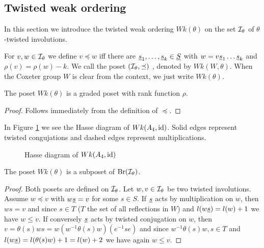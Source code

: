 \subsection{Twisted weak ordering}
\label{sec:twisted-involutions-twisted-weak-ordering}

In this section we introduce the twisted weak ordering $Wk(\theta)$ on the set $\mathcal{I}_{\theta}$ of $\theta$-twisted involutions.

\begin{defi}
	For $v,w \in \mathcal{I}_{\theta}$ we define $v \preceq w$ iff there are $\underline{s}_1, \ldots, \underline{s}_k \in \underline{S}$ with $w = v \underline{s}_1 \ldots \underline{s}_k$ and $\rho(v) = \rho(w) - k$. We call the poset $(\mathcal{I}_{\theta},\preceq)$ , denoted by $Wk(W, \theta)$. When the Coxeter group $W$ is clear from the context, we just write $Wk(\theta)$.
\end{defi}

\begin{lemm}
	The poset $Wk(\theta)$ is a graded poset with rank function $\rho$.

	\begin{proof}
		Follows immediately from the definition of $\preceq$.
	\end{proof}
\end{lemm}

\begin{exam}
	In Figure \ref{fig:a4} we see the Hasse diagram of $Wk(A_4, \operatorname{id})$. Solid edges represent twisted congujations and dashed edges represent multiplications.
	\begin{figure}[ht]
		\centering
		
		\caption{Hasse diagram of $Wk(A_4, \operatorname{id})$}
		\label{fig:a4}
	\end{figure}
\end{exam}

\begin{lemm}
	The poset $Wk(\theta)$ is a subposet of $\operatorname{Br}(\mathcal{I}_{\theta})$.

	\begin{proof}
		Both posets are defined on $\mathcal{I}_{\theta}$. Let $w,v \in \mathcal{I}_{\theta}$ be two twisted involutions. Assume $w \preceq v$ with $w \underline{s} = v$ for some $s \in S$. If $\underline{s}$ acts by multiplication on $w$, then $ws = v$ and since $s \in T$ ($T$ the set of all reflections in $W$) and $l(w \underline{s}) = l(w) + 1$ we have $w \leq v$. If conversely $\underline{s}$ acts by twisted conjugation on $w$, then $v = \theta(s)ws = w (w^{-1} \theta(s) w)(e^{-1}se)$ and since $w^{-1} \theta(s) w, s \in T$ and $l(w \underline{s}) = l(\theta(s)w) + 1 = l(w) + 2$ we have again $w \leq v$.
	\end{proof}
\end{lemm}

